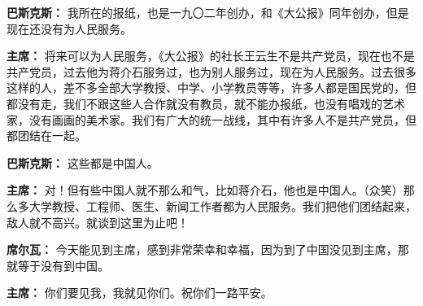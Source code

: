 \begin{list}{}
\item[\textbf{巴斯克斯：}] 我所在的报纸，也是一九〇二年创办，和《大公报》同年创办，但是现在还没有为人民服务。

\item[\textbf{主席：}] 将来可以为人民服务，《大公报》的社长王云生不是共产党员，现在也不是共产党员，过去他为蒋介石服务过，也为别人服务过，现在为人民服务。过去很多这样的人，差不多全部大学教授、中学、小学教员等等，许多人都是国民党的，但都没有走，我们不跟这些人合作就没有教员，就不能办报纸，也没有唱戏的艺术家，没有画画的美术家。我们有广大的统一战线，其中有许多人不是共产党员，但都团结在一起。

\item[\textbf{巴斯克斯：}] 这些都是中国人。

\item[\textbf{主席：}] 对！但有些中国人就不那么和气，比如蒋介石，他也是中国人。（众笑）那么多大学教授、工程师、医生、新闻工作者都为人民服务。我们把他们团结起来，敌人就不高兴。就谈到这里为止吧！

\item[\textbf{席尔瓦：}] 今天能见到主席，感到非常荣幸和幸福，因为到了中国没见到主席，那就等于没有到中国。

\item[\textbf{主席：}] 你们要见我，我就见你们。祝你们一路平安。

\end{list}

